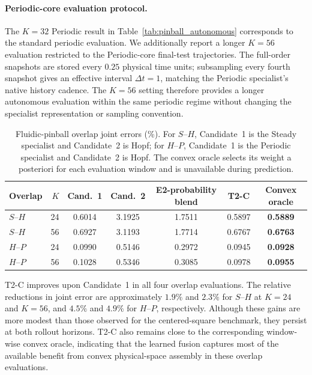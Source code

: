 \documentclass{article}
\begin{document}
\paragraph{Periodic-core evaluation protocol.}
The $K=32$ Periodic result in Table~\ref{tab:pinball_autonomous} corresponds to the standard periodic evaluation. We additionally report a longer $K=56$ evaluation restricted to the Periodic-core final-test trajectories. The full-order snapshots are stored every $0.25$ physical time units; subsampling every fourth snapshot gives an effective interval $\Delta t=1$, matching the Periodic specialist's native history cadence. The $K=56$ setting therefore provides a longer autonomous evaluation within the same periodic regime without changing the specialist representation or
sampling convention.

\par


\begin{table}[H]
\centering
\caption{
Fluidic-pinball overlap joint errors (\%). For $S$--$H$, Candidate~1 is the Steady specialist and Candidate~2 is Hopf; for $H$--$P$, Candidate~1 is the Periodic specialist and Candidate~2 is Hopf.
The convex oracle selects its weight a posteriori for each evaluation window and is unavailable during prediction.
}
\label{tab:pinball_overlap}
\small
\setlength{\tabcolsep}{3.5pt}
\begin{tabular}{lrccccc}
\toprule
Overlap & $K$ & Cand.~1 & Cand.~2 & E2-probability blend & T2-C & Convex oracle \\
\midrule
$S$--$H$ & 24 & 0.6014 & 3.1925 & 1.7511 & 0.5897 & \textbf{0.5889} \\
$S$--$H$ & 56 & 0.6927 & 3.1193 & 1.7714 & 0.6767 & \textbf{0.6763} \\
$H$--$P$ & 24 & 0.0990 & 0.5146 & 0.2972 & 0.0945 & \textbf{0.0928} \\
$H$--$P$ & 56 & 0.1028 & 0.5346 & 0.3085 & 0.0978 & \textbf{0.0955} \\
\bottomrule
\end{tabular}
\end{table}


\par

T2-C improves upon Candidate~1 in all four overlap evaluations.
The relative reductions in joint error are approximately $1.9\%$ and
$2.3\%$ for $S$--$H$ at $K=24$ and $K=56$, and $4.5\%$ and $4.9\%$
for $H$--$P$, respectively. Although these gains are more modest than those observed for the centered-square benchmark, they persist at both rollout horizons. T2-C also remains close to the corresponding window-wise convex oracle, indicating that the learned fusion captures most of the available benefit from convex physical-space assembly in these overlap evaluations.
\end{document}
